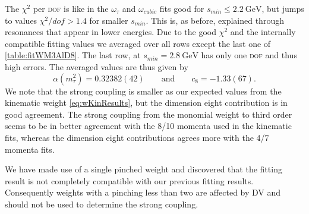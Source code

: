 \documentclass[../../index.tex]{subfiles}
\begin{document}
The $\chi^2$ per \textsc{dof} is like in the $\omega_\tau$ and $\omega_{cubic}$
fits good for $s_{min}\leq \SI{2.2}{\giga\eV}$, but jumps to values
$\chi^2/dof>1.4$ for smaller $s_{min}$. This is, as before, explained through
resonances that appear in lower energies. Due to the good $\chi^2$ and the
internally compatible fitting values we averaged over all rows except the last
one of \cref{table:fitWM3AlD8}. The last row, at $s_{min}=\SI{2.8}{\giga\eV}$
has only one \textsc{dof} and thus high errors. The averaged values are
thus given by 
\begin{equation}
  \alpha(m_\tau^2) = 0.32382(42) \qquad \text{and} \qquad c_8=-1.33(67).
\end{equation}
We note that the strong coupling is smaller as our expected values from the
kinematic weight \cref{eq:wKinResults}, but the dimension eight contribution
is in good agreement. The strong coupling from the monomial weight to third
order seems to be in better agreement with the 8\-/10 momenta used in the
kinematic fits, whereas the dimension eight contributions agrees more with the
4\-/7 momenta fits.

We have made use of a single pinched weight and discovered that the fitting
result is not completely compatible with our previous fitting results.
Consequently weights with a pinching less than two are affected by \textsc{DV}
and should not be used to determine the strong coupling.
\end{document}
